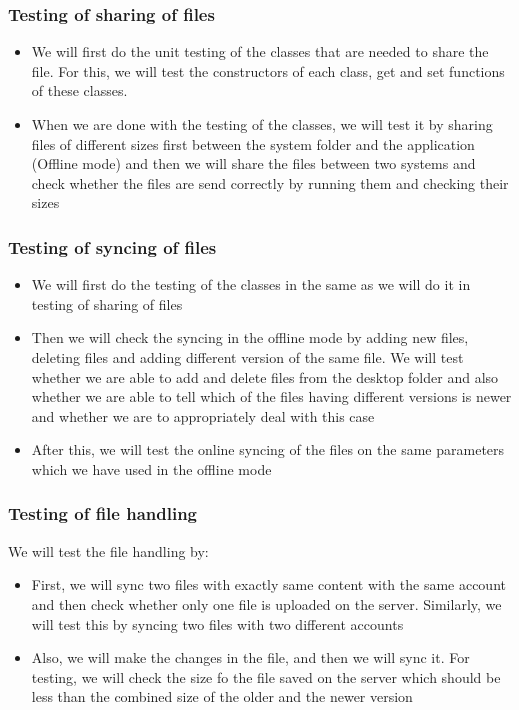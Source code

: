 \documentclass{article}
\begin{document}
			\subsubsection{Testing of sharing of files}
				\begin{itemize}
					\item We will first do the unit testing of the classes that are needed to share the file. For this, we will test the constructors of each class, get and set functions of these classes.
					\item When we are done with the testing of the classes, we will test it by sharing files of different sizes first between the system folder and the application (Offline mode) and then we will share the files between two systems and check whether the files are send correctly by running them and checking their sizes
				\end{itemize}
			\subsubsection{Testing of syncing of files}
				\begin{itemize}
					\item We will first do the testing of the classes in the same as we will do it in testing of sharing of files
					\item Then we will check the syncing in the offline mode by adding new files, deleting files and adding different version of the same file. We will test whether we are able to add and delete files from the desktop folder  and also whether we are able to tell which of the files having different versions is newer and whether we are to appropriately deal with this case
					\item After this, we will test the online syncing of the files on the same parameters which we have used in the offline mode
				\end{itemize}
			\subsubsection{Testing of file handling}
				We will test the file handling by:
				\begin{itemize}
					\item First, we will sync two files with exactly same content with the same account and then check whether only one file is uploaded on the server. Similarly, we will test this by syncing two files with two different accounts
					\item Also, we will make the changes in the file, and then we will sync it. For testing, we will check the size fo the file saved on the server which should be less than the combined size of the older and the newer version
				\end{itemize}
\end{document}
